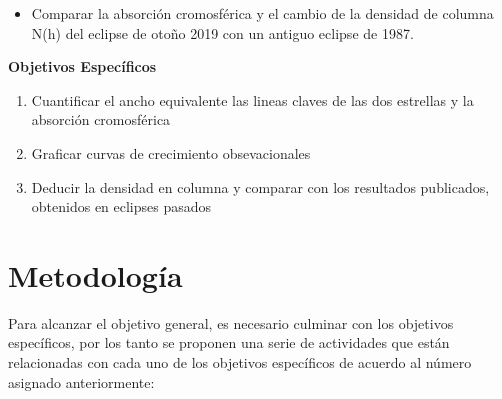 \documentclass[11pt]{article}
\begin{document}
\begin{itemize}
\item Comparar la absorción cromosférica y el cambio de la densidad de columna N(h) del eclipse de otoño 2019 con un antiguo eclipse de 1987.
\end{itemize}
\textbf{Objetivos Espec\'ificos}
\begin{enumerate}
    \item Cuantificar el ancho equivalente las lineas claves de las dos estrellas y la  absorción cromosférica

    \item Graficar curvas de crecimiento obsevacionales

    \item Deducir la densidad en columna y comparar con los resultados publicados, obtenidos en eclipses pasados
\end{enumerate}


\section{Metodolog\'ia}

Para alcanzar el objetivo general, es necesario culminar con los objetivos específicos, por los tanto  se proponen una serie de actividades que están relacionadas con cada uno de los objetivos específicos de acuerdo al número asignado anteriormente:
\end{document}
